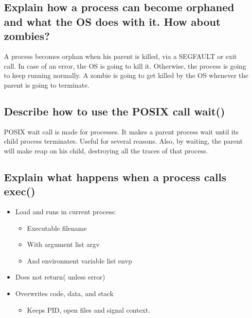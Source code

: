 \documentclass[a4paper]{article}
\begin{document}
\subsection{Explain how a process can become orphaned and what the OS does with it. How about zombies?} %
\label{sub:Explain how a process can become orphaned and what the OS does with it. How about zombies?}
A process becomes orphan when his parent is killed, via a SEGFAULT or exit call. In case of an error, the OS is going to kill it.
Otherwise, the process is going to keep running normally. A zombie is going to get killed by the OS whenever the parent
is going to terminate.
\subsection{Describe how to use the POSIX call wait()} %
\label{sub:Describe how to use the POSIX call wait()}
POSIX wait call is made for processes. It makes a parent process wait until its child process terminates. Useful for several reasons. Also, by waiting, the parent will make reap on his child, destroying all the traces of that process.
\subsection{Explain what happens when a process calls exec()} %
\label{sub:Explain what happens when a process calls exec()}
\begin{itemize}
  \item Load and runs in current process:
    \begin{itemize}
      \item Executable filename
      \item With argument list argv
      \item And environment variable list envp
    \end{itemize}
  \item Does not return( unless error)
  \item Overwrites code, data, and stack
  \begin{itemize}
    \item Keeps PID, open files and signal context.
  \end{itemize}
\end{itemize}
\end{document}
